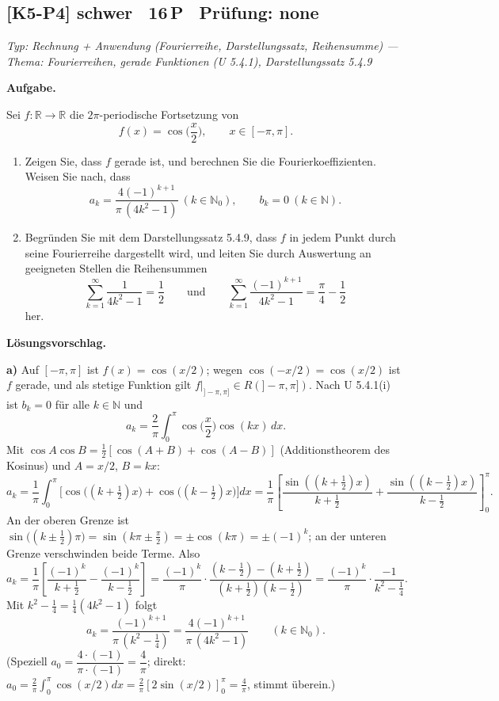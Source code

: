 \documentclass[a4paper,11pt]{article}
\begin{document}
\subsection*{[K5-P4] \normalfont schwer \textbullet\ 16\,P \textbullet\ Pr\"ufung: none}
\textit{Typ: Rechnung + Anwendung (Fourierreihe, Darstellungssatz, Reihensumme)  ---  Thema: Fourierreihen, gerade Funktionen (U 5.4.1), Darstellungssatz 5.4.9}\par\smallskip
\textbf{Aufgabe.}\par
Sei $f:\mathbb{R}\to\mathbb{R}$ die $2\pi$-periodische Fortsetzung von
\[ f(x)=\cos\!\Big(\frac{x}{2}\Big),\qquad x\in[-\pi,\pi]. \]
\begin{enumerate}[label=\alph*)]
  \item Zeigen Sie, dass $f$ gerade ist, und berechnen Sie die Fourierkoeffizienten. Weisen Sie nach, dass
  \[ a_k=\frac{4(-1)^{k+1}}{\pi\,(4k^{2}-1)}\ (k\in\mathbb{N}_0),\qquad b_k=0\ (k\in\mathbb{N}). \]
  \item Begründen Sie mit dem Darstellungssatz 5.4.9, dass $f$ in jedem Punkt durch seine Fourierreihe dargestellt wird, und leiten Sie durch Auswertung an geeigneten Stellen die Reihensummen
  \[ \sum_{k=1}^{\infty}\frac{1}{4k^{2}-1}=\frac{1}{2}\qquad\text{und}\qquad \sum_{k=1}^{\infty}\frac{(-1)^{k+1}}{4k^{2}-1}=\frac{\pi}{4}-\frac{1}{2} \]
  her.
\end{enumerate}\par\smallskip
\textbf{L\"osungsvorschlag.}\par
\textbf{a)} Auf $[-\pi,\pi]$ ist $f(x)=\cos(x/2)$; wegen $\cos(-x/2)=\cos(x/2)$ ist $f$ gerade, und als stetige Funktion gilt $f|_{]-\pi,\pi]}\in R(]-\pi,\pi])$. Nach U 5.4.1(i) ist $b_k=0$ für alle $k\in\mathbb{N}$ und
\[ a_k=\frac{2}{\pi}\int_0^\pi \cos\!\Big(\frac{x}{2}\Big)\cos(kx)\,dx. \]
Mit $\cos A\cos B=\tfrac12[\cos(A+B)+\cos(A-B)]$ (Additionstheorem des Kosinus) und $A=x/2$, $B=kx$:
\[ a_k=\frac{1}{\pi}\int_0^\pi\Big[\cos\!\big((k+\tfrac12)x\big)+\cos\!\big((k-\tfrac12)x\big)\Big]dx = \frac{1}{\pi}\left[\frac{\sin((k+\frac12)x)}{k+\frac12}+\frac{\sin((k-\frac12)x)}{k-\frac12}\right]_0^\pi. \]
An der oberen Grenze ist $\sin\!\big((k\pm\tfrac12)\pi\big)=\sin(k\pi\pm\tfrac{\pi}{2})=\pm\cos(k\pi)=\pm(-1)^k$; an der unteren Grenze verschwinden beide Terme. Also
\[ a_k=\frac{1}{\pi}\left[\frac{(-1)^k}{k+\frac12}-\frac{(-1)^k}{k-\frac12}\right] = \frac{(-1)^k}{\pi}\cdot\frac{(k-\frac12)-(k+\frac12)}{(k+\frac12)(k-\frac12)} = \frac{(-1)^k}{\pi}\cdot\frac{-1}{k^2-\frac14}. \]
Mit $k^2-\tfrac14=\tfrac14(4k^2-1)$ folgt
\[ a_k=\frac{(-1)^{k+1}}{\pi\,(k^2-\frac14)}=\frac{4(-1)^{k+1}}{\pi\,(4k^2-1)}\qquad(k\in\mathbb{N}_0). \]
(Speziell $a_0=\dfrac{4\cdot(-1)}{\pi\cdot(-1)}=\dfrac{4}{\pi}$; direkt: $a_0=\tfrac{2}{\pi}\int_0^\pi\cos(x/2)dx=\tfrac{2}{\pi}[2\sin(x/2)]_0^\pi=\tfrac{4}{\pi}$, stimmt überein.)
\end{document}
